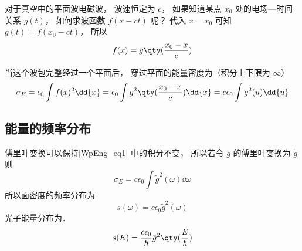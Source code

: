 
对于真空中的平面波电磁波， 波速恒定为 $c$， 如果知道某点 $x_0$ 处的电场—时间关系 $g(t)$， 如何求波函数 $f(x - ct)$ 呢？ 代入 $x = x_0$ 可知 $g(t) = f(x_0 - ct)$， 所以
\begin{equation}
f(x) = g\qty(\frac{x_0 - x}{c})
\end{equation}

当这个波包完整经过一个平面后， 穿过平面的能量密度为（积分上下限为 $\infty$）
\begin{equation}\label{WpEng_eq1}
\sigma_E = \epsilon_0 \int f(x)^2 \dd{x} = \epsilon_0  \int g^2\qty(\frac{x_0 - x}{c}) \dd{x} = c\epsilon_0 \int g^2(u) \dd{u}
\end{equation}

\subsection{能量的频率分布}
傅里叶变换可以保持\autoref{WpEng_eq1} 中的积分不变， 所以若令 $g$ 的傅里叶变换为 $\tilde g$ 则
\begin{equation}
\sigma_E = c\epsilon_0 \int {\tilde g}^2(\omega) \dd{\omega}
\end{equation}
所以面密度的频率分布为
\begin{equation}
s(\omega) = c\epsilon_0 {\tilde g}^2(\omega)
\end{equation}
光子能量分布为．
\begin{equation}
s(E) = \frac{c\epsilon_0}{\hbar} {\tilde g}^2\qty(\frac{E}{\hbar})
\end{equation}

